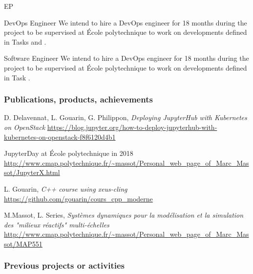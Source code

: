 \begin{sitedescription}{EP}





\begin{participant}[type=res,PM=18,salary=5500]{DevOps Engineer}
  We intend to hire a DevOps engineer for 18 months during the project to be supervised at \'Ecole polytechnique to work on developments defined in Tasks  and .
\end{participant}

\begin{participant}[type=res,PM=18,salary=5500]{Software Engineer}
  We intend to hire a DevOps engineer for 18 months during the project to be supervised at \'Ecole polytechnique to work on developments defined in Task .
\end{participant}

\subsubsection*{Publications, products, achievements}

\begin{compactenum}
\item D. Delavennat, L. Gouarin, G. Philippon, \emph{Deploying JupyterHub with Kubernetes on OpenStack} \newline
\url{https://blog.jupyter.org/how-to-deploy-jupyterhub-with-kubernetes-on-openstack-f8f6120d4b1}
\item JupyterDay at \'Ecole polytechnique in 2018 \newline
\url{http://www.cmap.polytechnique.fr/~massot/Personal_web_page_of_Marc_Massot/JupyterX.html}
\item L. Gouarin, \emph{C++ course using xeus-cling} \newline
\url{https://github.com/gouarin/cours_cpp_moderne}
\item M.Massot, L. Series, \emph{Systèmes dynamiques pour la modélisation et la simulation des "milieux réactifs" multi-échelles} \newline
\url{http://www.cmap.polytechnique.fr/~massot/Personal_web_page_of_Marc_Massot/MAP551}
\end{compactenum}

\subsubsection*{Previous projects or activities}


\end{sitedescription}

